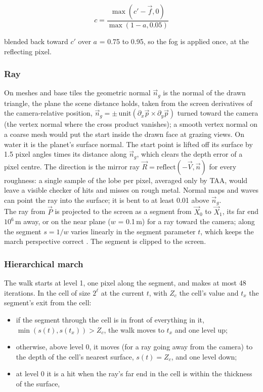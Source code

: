 \documentclass[Orbiter Technical Reference.tex]{subfiles}
\begin{document}
\begin{sloppypar}
\[ c = \frac{\max(c' - \vec{f}, 0)}{\max(1 - a, 0.05)} \]

\noindent
blended back toward $c'$ over $a$ = 0.75 to 0.95, so the fog is applied once, at the reflecting pixel.

\subsubsection{Ray}
On meshes and base tiles the geometric normal $\vec{n}_{g}$ is the normal of the drawn triangle, the plane the scene distance holds, taken from the screen derivatives of the camera-relative position, $\vec{n}_{g} = \pm\,\mathrm{unit}(\partial_{x}\vec{p} \times \partial_{y}\vec{p})$ turned toward the camera (the vertex normal where the cross product vanishes); a smooth vertex normal on a coarse mesh would put the start inside the drawn face at grazing views. On water it is the planet's surface normal. The start point is lifted off its surface by 1.5 pixel angles times its distance along $\vec{n}_{g}$, which clears the depth error of a pixel centre. The direction is the mirror ray $\vec{R} = \mathrm{reflect}(-\vec{V}, \vec{n})$ for every roughness: a single sample of the lobe per pixel, averaged only by TAA, would leave a visible checker of hits and misses on rough metal. Normal maps and waves can point the ray into the surface; it is bent to at least 0.01 above $\vec{n}_{g}$.\\
The ray from $\vec{P}$ is projected to the screen as a segment from $\vec{X}_{0}$ to $\vec{X}_{1}$, its far end $10^{6}$\,m away, or on the near plane ($w$ = 0.1\,m) for a ray toward the camera; along the segment $s = 1/w$ varies linearly in the segment parameter $t$, which keeps the march perspective correct \cite{mcguire2014}. The segment is clipped to the screen.

\subsubsection{Hierarchical march}
The walk starts at level 1, one pixel along the segment, and makes at most 48 iterations. In the cell of size $2^{\ell}$ at the current $t$, with $Z_{c}$ the cell's value and $t_{x}$ the segment's exit from the cell:

\begin{itemize}
\item if the segment through the cell is in front of everything in it, $\min(s(t), s(t_{x})) > Z_{c}$, the walk moves to $t_{x}$ and one level up;
\item otherwise, above level 0, it moves (for a ray going away from the camera) to the depth of the cell's nearest surface, $s(t) = Z_{c}$, and one level down;
\item at level 0 it is a hit when the ray's far end in the cell is within the thickness of the surface,


\end{itemize}
\end{sloppypar}
\end{document}
